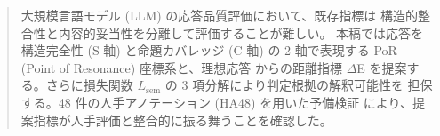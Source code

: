 \begin{abstract}
大規模言語モデル (LLM) の応答品質評価において、既存指標は
構造的整合性と内容的妥当性を分離して評価することが難しい。
本稿では応答を構造完全性 (S 軸) と命題カバレッジ (C 軸) の
2 軸で表現する PoR (Point of Resonance) 座標系と、理想応答
からの距離指標 $\Delta$E を提案する。さらに損失関数
$L_{\mathrm{sem}}$ の 3 項分解により判定根拠の解釈可能性を
担保する。48 件の人手アノテーション (HA48) を用いた予備検証
により、提案指標が人手評価と整合的に振る舞うことを確認した。
\end{abstract}
